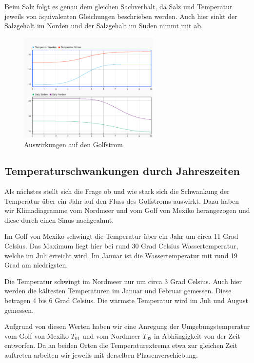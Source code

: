 \documentclass[a4paper,twoside]{article}
\begin{document}
	Beim Salz folgt es genau dem gleichen Sachverhalt, da Salz und Temperatur jeweils von äquivalenten Gleichungen beschrieben werden. Auch hier sinkt der Salzgehalt im Norden und der Salzgehalt im Süden nimmt mit ab.

	\begin{figure}[!h]
  		\centering
 		\includegraphics[width=7cm]{Grafiken/Arktis_schmiltz_werte.png}
  		\caption{Auswirkungen auf den Golfstrom}
  		\label{fig:schmilztGolf}
	\end{figure}

	\subsection{Temperaturschwankungen durch Jahreszeiten} \label{TempDurchJahreszeiten}
	
	Als nächstes stellt sich die Frage ob und wie stark sich die Schwankung der Temperatur über ein Jahr auf den Fluss des Golfstroms auswirkt. Dazu haben wir Klimadiagramme vom Nordmeer und vom Golf von Mexiko herangezogen und diese durch einen Sinus nachgeahmt. 
	
	Im Golf von Mexiko schwingt die Temperatur über ein Jahr um circa 11 Grad Celsius. Das Maximum liegt hier bei rund 30 Grad Celsius Wassertemperatur, welche im Juli erreicht wird. Im Januar ist die Wassertemperatur mit rund 19 Grad am niedrigsten.
	
	Die Temperatur schwingt im Nordmeer nur um circa 3 Grad Celsius. Auch hier werden die kältesten Temperaturen im Januar und Februar gemessen. Diese betragen 4 bis 6 Grad Celsius. Die wärmste Temperatur wird im Juli und August gemessen. 
	
	Aufgrund von diesen Werten haben wir eine Anregung der Umgebungstemperatur vom Golf von Mexiko \(T_{01}\) und vom Nordmeer \(T_{02}\) in Abhängigkeit von der Zeit entworfen. Da an beiden Orten die Temperaturextrema etwa zur gleichen Zeit auftreten arbeiten wir jeweils mit derselben Phasenverschiebung. 
	
\end{document}
